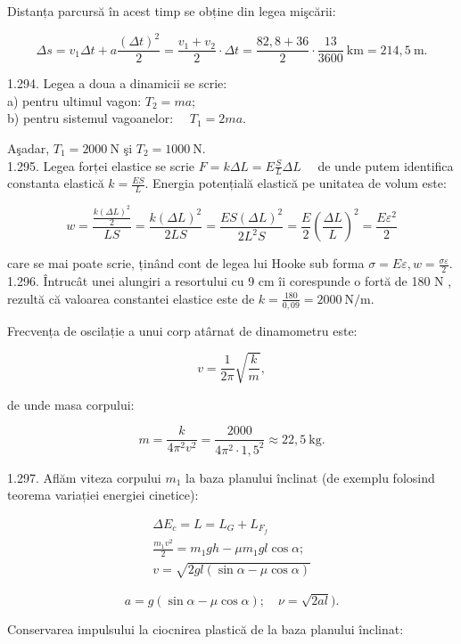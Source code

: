 Distanța parcursă în acest timp se obține din legea mişcării:

$$
\Delta s=v_{1} \Delta t+a \frac{(\Delta t)^{2}}{2}=\frac{v_{1}+v_{2}}{2} \cdot \Delta t=\frac{82,8+36}{2} \cdot \frac{13}{3600} \mathrm{~km}=214,5 \mathrm{~m} .
$$

1.294. Legea a doua a dinamicii se scrie:\\
a) pentru ultimul vagon: $T_{2}=m a$;\\
b) pentru sistemul vagoanelor: $\quad T_{1}=2 m a$.

Aşadar, $T_{1}=2000 \mathrm{~N}$ şi $T_{2}=1000 \mathrm{~N}$.\\
1.295. Legea forței elastice se scrie $F=k \Delta L=E \frac{S}{L} \Delta L \quad$ de unde putem identifica constanta elastică $k=\frac{E S}{L}$. Energia potențială elastică pe unitatea de volum este:

$$
w=\frac{\frac{k(\Delta L)^{2}}{2}}{L S}=\frac{k(\Delta L)^{2}}{2 L S}=\frac{E S(\Delta L)^{2}}{2 L^{2} S}=\frac{E}{2}\left(\frac{\Delta L}{L}\right)^{2}=\frac{E \varepsilon^{2}}{2}
$$

care se mai poate scrie, ținând cont de legea lui Hooke sub forma $\sigma=E \varepsilon, w=\frac{\sigma \varepsilon}{2}$.\\
1.296. Întrucât unei alungiri a resortului cu 9 cm îi corespunde o fortă de 180 N , rezultă că valoarea constantei elastice este de $k=\frac{180}{0,09}=2000 \mathrm{~N} / \mathrm{m}$.

Frecvența de oscilație a unui corp atârnat de dinamometru este:

$$
v=\frac{1}{2 \pi} \sqrt{\frac{k}{m}},
$$

de unde masa corpului:

$$
m=\frac{k}{4 \pi^{2} v^{2}}=\frac{2000}{4 \pi^{2} \cdot 1,5^{2}} \approx 22,5 \mathrm{~kg} .
$$

1.297. Aflăm viteza corpului $m_{1}$ la baza planului înclinat (de exemplu folosind teorema variației energiei cinetice):


\begin{gather*}
\Delta E_{c}=L=L_{G}+L_{F_{f}} \\
\frac{m_{1} v^{2}}{2}=m_{1} g h-\mu m_{1} g l \cos \alpha ; \\
v=\sqrt{2 g l(\sin \alpha-\mu \cos \alpha)} \tag{(Variantă:}
\end{gather*}


$$
a=g(\sin \alpha-\mu \cos \alpha) ; \quad \nu=\sqrt{2 a l}) .
$$

Conservarea impulsului la ciocnirea plastică de la baza planului înclinat:

